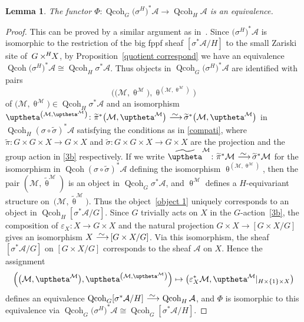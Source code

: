 \documentclass[10pt,a4paper]{amsart}
\newtheorem{lem}[dfn]{Lemma}
\numberwithin{equation}{section}
\newcommand{\Qcoh}{\operatorname{Qcoh}}
\newcommand{\cA}{\mathcal{A}}
\newcommand{\cM}{\mathcal{M}}
\newcommand{\simto}{\,\,\,\,\raisebox{4pt}{$\sim$}{\kern -1.1em \longrightarrow}\,}
\newcommand{\timesH}{\times^{\hspace{-0.2mm}H\hspace{0.2mm}}\!\!}
\begin{document}
\begin{lem}%
The functor $\Phi\colon \Qcoh _G\big(\sigma^H\big)^*\cA\to \Qcoh_H\cA$ is an equivalence.
\end{lem}
\begin{proof} This can be proved by a similar argument as in~\cite[Lemma~1.3]{tho}.
 Since $\big(\sigma^H\big)^*\cA$ is isomorphic to the restriction of the big fppf sheaf $[\sigma^*\cA/H]$ to the small Zariski site of~\mbox{$G\timesH X$}, by Proposition~\ref{quotient correspond} we have an equivalence $\Qcoh\big(\sigma^H\big)^*\cA\cong \Qcoh_H\sigma^*\cA$. Thus objects in $\Qcoh _G\big(\sigma^H\big)^*\cA$ are identified with pairs
\begin{equation}\label{object 1}
\Big(\big(\cM,\uptheta^{\cM}\big), \uptheta^{\left(\cM,\uptheta^{\cM}\right)}\Big)
\end{equation}
{\sloppy of $\big(\cM,\uptheta^{\cM}\big)\in \Qcoh_H\sigma^*\cA$ and an isomorphism $\uptheta^{\left(\cM,\uptheta^{\cM}\right)}\colon \widetilde{\pi}^*\big(\cM,\uptheta^{\cM}\big)\simto \widetilde{\sigma}^*\big(\cM,\uptheta^{\cM}\big)$ in $\Qcoh_H(\sigma\circ\widetilde{\sigma})^*\cA$ satisfying the conditions as in \eqref{compati}, where $\widetilde{\pi}\colon G\times G\times X\to G\times X$ and $\widetilde{\sigma}\colon G\times G\times X\to G\times X$ are the projection and the group action in \eqref{3b} respectively. If we write $\widetilde{\uptheta}^{\cM}\colon \widetilde{\pi}^*\cM\simto\widetilde{\sigma}^*\cM$ for the isomorphism in $\Qcoh(\sigma\circ\widetilde{\sigma})^*\cA$ defining the isomorphism $\uptheta^{\left(\cM,\uptheta^{\cM}\right)}$, then the pair $(\cM,\widetilde{\uptheta}^{\cM})$ is an object in $\Qcoh_G\sigma^*\cA$, and $\uptheta^{\cM}$ defines a $H$-equivariant structure on~$\big(\cM,\widetilde{\uptheta}^{\cM}\big)$. Thus the object~\eqref{object 1} uniquely corresponds to an object in $\Qcoh_H[\sigma^*\cA/G]$. Since $G$ trivially acts on $X$ in the $G$-action~\eqref{3b}, the composition of $\varepsilon_X\colon X\to G\times X$ and the natural projection $G\times X\to [G\times X/G]$ gives an isomorphism $ X\simto[G\times X/G]$. Via this isomorphism, the sheaf $[\sigma^*\cA/G]$ on $[G\times X/G]$ corresponds to the sheaf $\cA$ on $X$. Hence the assignment
 \begin{gather*}
 \Bigl(\big(\cM,\uptheta^{\cM}\big), \uptheta^{\left(\cM,\uptheta^{\cM}\right)}\Bigr)\mapsto \big(\varepsilon_X^*\cM,\uptheta^{\cM}|_{H\times \{1\}\times X}\big)
 \end{gather*}}\noindent
 defines an equivalence $\Qcoh_G[\sigma^*\cA/H]\simto \Qcoh_H\cA$, and $\Phi$ is isomorphic to this equivalence via $\Qcoh _G\big(\sigma^H\big)^*\cA\cong \Qcoh_G[\sigma^*\cA/H]$.
 \end{proof}
\end{document}
